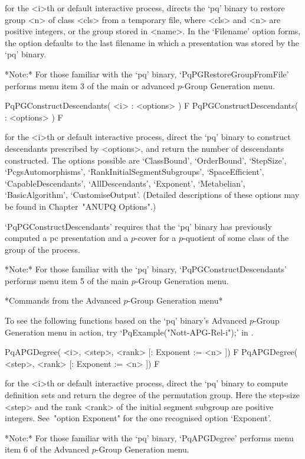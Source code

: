 for the <i>th or default interactive {\ANUPQ} process, directs  the  `pq'
binary to restore group <n> of class <cls> from a temporary  file,  where
<cls> and <n> are positive integers, or the group stored  in  <name>.  In
the `Filename' option forms, the option defaults to the last filename  in
which a presentation was stored by the `pq' binary.

*Note:* 
For those  familiar  with  the  `pq'  binary,  `PqPGRestoreGroupFromFile'
performs menu item 3 of the main or advanced $p$-Group Generation menu.

\>PqPGConstructDescendants( <i> : <options> ) F
\>PqPGConstructDescendants( : <options> ) F

for the <i>th or default interactive {\ANUPQ} process,  direct  the  `pq'
binary to construct descendants prescribed by <options>, and  return  the
number of descendants constructed. The options possible are `ClassBound',
`OrderBound',              `StepSize',               `PcgsAutomorphisms',
`RankInitialSegmentSubgroups',  `SpaceEfficient',   `CapableDescendants',
`AllDescendants',     `Exponent',     `Metabelian',     `BasicAlgorithm',
`CustomiseOutput'. (Detailed descriptions of these options may  be  found
in Chapter~"ANUPQ Options".)

`PqPGConstructDescendants' requires that the `pq' binary  has  previously
computed a pc presentation and a $p$-cover for  a  $p$-quotient  of  some
class of the group of the process.

*Note:* 
For those  familiar  with  the  `pq'  binary,  `PqPGConstructDescendants'
performs menu item 5 of the main $p$-Group Generation menu.

*Commands from the Advanced $p$-Group Generation menu*

To see the following  functions  based  on  the  `pq'  binary's  Advanced
$p$-Group Generation menu in action,  try  `PqExample("Nott-APG-Rel-i");'
in {\GAP}.

\>PqAPGDegree( <i>, <step>, <rank> [: Exponent := <n> ]) F
\>PqAPGDegree( <step>, <rank> [: Exponent := <n> ]) F

for the <i>th or default interactive {\ANUPQ} process,  direct  the  `pq'
binary  to  compute  definition  sets  and  return  the  degree  of   the
permutation group. Here the step-size <step> and the rank <rank>  of  the
initial segment subgroup are positive integers. See~"option Exponent" for
the one recognised option `Exponent'.

*Note:* For those familiar with the `pq' binary,  `PqAPGDegree'  performs
menu item 6 of the Advanced $p$-Group Generation menu.

